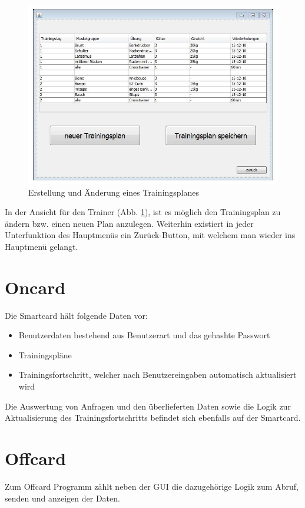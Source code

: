 \documentclass[a4paper,12pt]{article}
\begin{document}
\begin{figure}[htb]
\begin{center}
 \includegraphics[width=0.75\hsize]{./trainerView.jpg}
 \end{center}
\caption[Erstellung und Änderung eines Trainingsplanes]{\label{trainerView}Erstellung und Änderung eines Trainingsplanes}
\end{figure}
In der Ansicht für den Trainer  (Abb. \ref{trainerView}), ist es möglich den Trainingsplan zu ändern bzw. einen neuen Plan anzulegen. Weiterhin existiert in jeder Unterfunktion des Hauptmenüs ein Zurück-Button, mit welchem man wieder ins Hauptmenü gelangt.

\section{Oncard}
Die Smartcard hält folgende Daten vor:
\begin{itemize}
\item Benutzerdaten bestehend aus Benutzerart und das gehashte Passwort
\item Trainingspläne
\item Trainingsfortschritt, welcher nach Benutzereingaben automatisch aktualisiert wird
\end{itemize}

Die Auswertung von Anfragen und den überlieferten Daten sowie die Logik zur Aktualisierung des Trainingsfortschritts befindet sich ebenfalls auf der Smartcard.


\section{Offcard}
Zum Offcard Programm zählt neben der GUI die dazugehörige Logik zum Abruf, senden und anzeigen der Daten.\\
\end{document}
